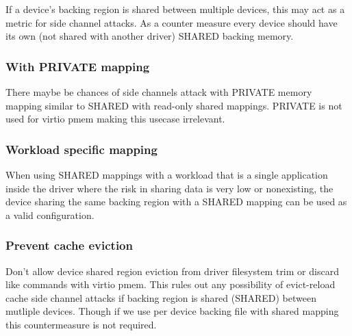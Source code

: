 If a device's backing region is shared between multiple devices, this may act
as a metric for side channel attacks. As a counter measure every device
should have its own (not shared with another driver) SHARED backing memory.

\subsubsection{With PRIVATE mapping}\label{sec:Device Types / PMEM Device / Possible Security Implications / Countermeasures / PRIVATE}
There maybe be chances of side channels attack with PRIVATE
memory mapping similar to SHARED with read-only shared mappings.
PRIVATE is not used for virtio pmem making this usecase
irrelevant.

\subsubsection{Workload specific mapping}\label{sec:Device Types / PMEM Device / Possible Security Implications / Countermeasures / Workload}
When using SHARED mappings with a workload that is a single application
inside the driver where the risk in sharing data is very low or
nonexisting, the device sharing the same backing region with a SHARED
mapping can be used as a valid configuration.

\subsubsection{Prevent cache eviction}\label{sec:Device Types / PMEM Device / Possible Security Implications / Countermeasures / Cache eviction}
Don't allow device shared region eviction from driver filesystem trim or discard
like commands with virtio pmem. This rules out any possibility of evict-reload
cache side channel attacks if backing region is shared (SHARED)
between mutliple devices. Though if we use per device backing file with
shared mapping this countermeasure is not required.
